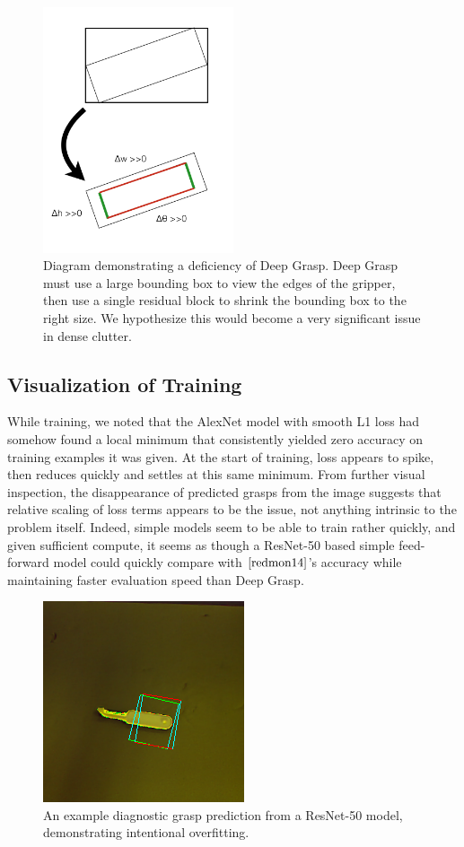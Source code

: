 \documentclass[10pt,twocolumn,letterpaper]{article}
\begin{document}
\begin{figure}
    \centering
    \includegraphics[width=0.5\textwidth]{images/diagram.png}
    \caption{Diagram demonstrating a deficiency of Deep Grasp. Deep Grasp must use a large bounding box to view the edges of the gripper, then use a single residual block to shrink the bounding box to the right size. We hypothesize this would become a very significant issue in dense clutter.}
\end{figure}


\subsection*{Visualization of Training}

While training, we noted that the AlexNet model with smooth L1 loss had somehow found a local minimum that consistently yielded zero accuracy on training examples it was given. At the start of training, loss appears to spike, then reduces quickly and settles at this same minimum. From further visual inspection, the disappearance of predicted grasps from the image suggests that relative scaling of loss terms appears to be the issue, not anything intrinsic to the problem itself. Indeed, simple models seem to be able to train rather quickly, and given sufficient compute, it seems as though a ResNet-50 based simple feed-forward model could quickly compare with $\cite{redmon14}$'s accuracy while maintaining faster evaluation speed than Deep Grasp. 

\begin{figure}
    \label{fig:example}
    \centering
    \includegraphics{latex/whoa-3-199.png}
    \caption{An example diagnostic grasp prediction from a ResNet-50 model, demonstrating intentional overfitting.}
    \label{fig:my_label}
\end{figure}
\end{document}
